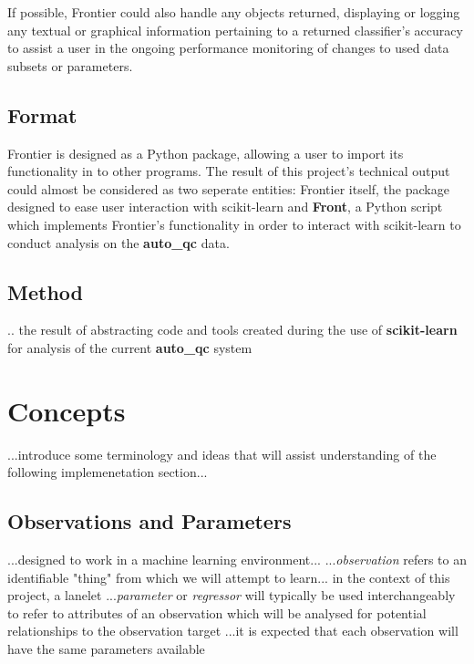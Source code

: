 If possible, Frontier could also handle any objects returned, displaying or
logging any textual or graphical information pertaining to a returned
classifier's accuracy to assist a user in the ongoing performance monitoring of
changes to used data subsets or parameters.


\subsection{Format}

Frontier is designed as a Python package, allowing a user to import its
functionality in to other programs. The result of this project's technical
output could almost be considered as two seperate entities: Frontier itself, the
package designed to ease user interaction with scikit-learn and \textbf{Front},
a Python script which implements Frontier's functionality in order to interact
with scikit-learn to conduct analysis on the \textbf{auto\_qc} data.


\subsection{Method}

.. the result of abstracting code and tools created during the use of
\textbf{scikit-learn} for analysis of the current \textbf{auto\_qc} system


\section{Concepts}

...introduce some terminology and ideas that will assist understanding of the
following implemenetation section...

\subsection{Observations and Parameters}

...designed to work in a machine learning environment...
...\textit{observation} refers to an identifiable "thing" from which we will
attempt to learn... in the context of this project, a lanelet
...\textit{parameter} or \textit{regressor} will typically be used
interchangeably to refer to attributes of an observation which will be analysed
for potential relationships to the observation target
...it is expected that each observation will have the same parameters available



